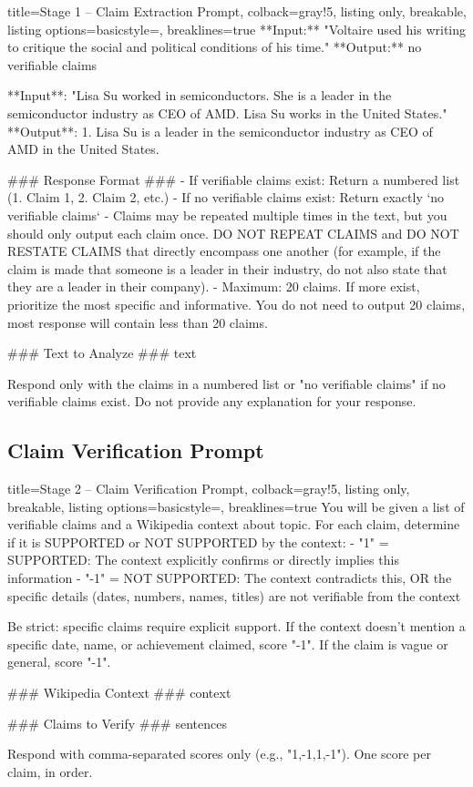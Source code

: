 \documentclass{article}
\begin{document}
\begin{tcblisting}{title=Stage 1 -- Claim Extraction Prompt, colback=gray!5, listing only, breakable, listing options={basicstyle=\ttfamily\tiny, breaklines=true}}
**Input:** "Voltaire used his writing to critique the social and political conditions of his time."
**Output:** no verifiable claims

**Input**: "Lisa Su worked in semiconductors. She is a leader in the semiconductor industry as CEO of AMD. Lisa Su works in the United States."
**Output**:
1. Lisa Su is a leader in the semiconductor industry as CEO of AMD in the United States.

### Response Format ###
- If verifiable claims exist: Return a numbered list (1. Claim 1, 2. Claim 2, etc.)
- If no verifiable claims exist: Return exactly `no verifiable claims`
- Claims may be repeated multiple times in the text, but you should only output each claim once. DO NOT REPEAT CLAIMS and DO NOT RESTATE CLAIMS that directly encompass one another (for example, if the claim is made that someone is a leader in their industry, do not also state that they are a leader in their company).
- Maximum: 20 claims. If more exist, prioritize the most specific and informative. You do not need to output 20 claims, most response will contain less than 20 claims.

### Text to Analyze ###
{text}

Respond only with the claims in a numbered list or "no verifiable claims" if no verifiable claims exist. Do not provide any explanation for your response.
\end{tcblisting}


\subsection{Claim Verification Prompt}
\label{app:bio_verification_prompt}

\begin{tcblisting}{title=Stage 2 -- Claim Verification Prompt, colback=gray!5, listing only, breakable, listing options={basicstyle=\ttfamily\tiny, breaklines=true}}
You will be given a list of verifiable claims and a Wikipedia context about {topic}.
For each claim, determine if it is SUPPORTED or NOT SUPPORTED by the context:
- "1" = SUPPORTED: The context explicitly confirms or directly implies this information
- "-1" = NOT SUPPORTED: The context contradicts this, OR the specific details (dates, numbers, names, titles) are not verifiable from the context

Be strict: specific claims require explicit support. If the context doesn't mention a specific date, name, or achievement claimed, score "-1". If the claim is vague or general, score "-1".

### Wikipedia Context ###
{context}

### Claims to Verify ###
{sentences}

Respond with comma-separated scores only (e.g., "1,-1,1,-1"). One score per claim, in order.
\end{tcblisting}
\end{document}
